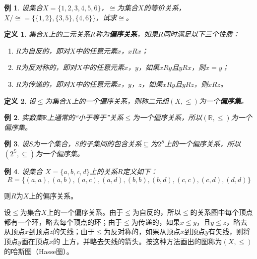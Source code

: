 \documentclass{book}[oneside]
\newtheorem{Def}{定义}[chapter]
\newtheorem{Example}{例}[chapter]
\begin{document}
\begin{CJK*}{UTF8}{gbsn}
  \begin{Example}
    设集合$X=\{1,2,3,4,5,6\}$，$\cong$为集合$X$的等价关系，$X/\cong=\{\{1,2\},\{3,5\},\{4,6\}\}$，试求$\cong$。
  \end{Example}
  \begin{Def}
    集合$X$上的二元关系$R$称为{\bfseries 偏序关系}，如果$R$同时满足以下三个性质：
    \begin{enumerate}
    \item $R$为自反的，即对$X$中的任意元素$x$，$xRx$；
    \item $R$为反对称的，即对$X$中的任意元素$x$，$y$，如果$xRy$且$yRx$，则$x=y$；
    \item $R$为传递的，即对$X$中的任意元素$x$，$y$，$z$，如果$xRy$且$yRz$，则$xRz$。
    \end{enumerate}
  \end{Def}
    \begin{Def}
    设$\leq$为集合$X$上的一个偏序关系，则称二元组$(X,\leq)$为一个{\bfseries 偏序集}。
  \end{Def}

    \begin{Example}
    实数集$\mathbb{R}$上通常的“小于等于”关系$\leq$为一个偏序关系，所以$(\mathbb{R},\leq)$为一个偏序集。
  \end{Example}
  \begin{Example}
    设$S$为一个集合，$S$的子集间的包含关系$\subseteq$为$2^S$上的一个偏序关系，所以$(2^{\mathbb{S}},\subseteq)$为一个偏序集。
  \end{Example}

  \begin{Example}
    设集合
    $X=\{a,b,c,d\}$上的关系$R$定义如下：
    \begin{equation*}
      R=\{(a,a),(a,b),(a,c),(a,d),(b,b),(b,d),(c,c),(c,d),(d,d)\}
    \end{equation*}
  \end{Example}
  则$R$为$X$上的偏序关系。

  设$\leq$为集合$X$上的一个偏序关系。由于$\leq$为自反的，所以$\leq$的关系图中每个顶点
  都有一个环，略去每个顶点的环；由于$\leq$为传递的，如果$x\leq y$，且$y\leq z$，略去从顶点$x$到顶点$z$的矢线；由于$\leq$为反对称的，如果从顶点$x$到顶点$y$有矢线，则将顶点$y$画在顶点$x$的
  上方，并略去矢线的箭头。按这种方法画出的图称为$(X,\leq)$的哈斯图（Hasse图）。


\end{CJK*}
\end{document}
